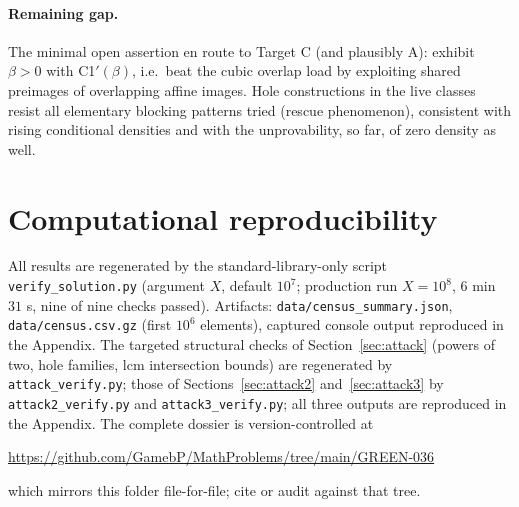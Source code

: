 \documentclass[11pt]{article}
\theoremstyle{definition}
\begin{document}
\paragraph{Remaining gap.}
The minimal open assertion en route to Target C (and plausibly A):
exhibit $\beta>0$ with C1$'(\beta)$, i.e.\ beat the cubic overlap load by
exploiting shared preimages of overlapping affine images. Hole constructions
in the live classes resist all elementary blocking patterns tried
(rescue phenomenon), consistent with rising conditional densities and with
the unprovability, so far, of zero density as well.

\section*{Computational reproducibility}
All results are regenerated by the standard-library-only script
\texttt{verify\_solution.py} (argument $X$, default $10^7$; production run
$X=10^8$, $6$ min $31$ s, nine of nine checks passed). Artifacts:
\texttt{data/census\_summary.json}, \texttt{data/census.csv.gz} (first
$10^6$ elements), captured console output reproduced in the Appendix.
The targeted structural checks of Section~\ref{sec:attack}
(powers of two, hole families, lcm intersection bounds) are regenerated by
\texttt{attack\_verify.py}; those of Sections~\ref{sec:attack2}
and~\ref{sec:attack3} by \texttt{attack2\_verify.py} and
\texttt{attack3\_verify.py}; all three outputs are reproduced in the
Appendix.
The complete dossier is version-controlled at
\begin{center}
\url{https://github.com/GamebP/MathProblems/tree/main/GREEN-036}
\end{center}
which mirrors this folder file-for-file; cite or audit against that tree.

\appendix
\end{document}
